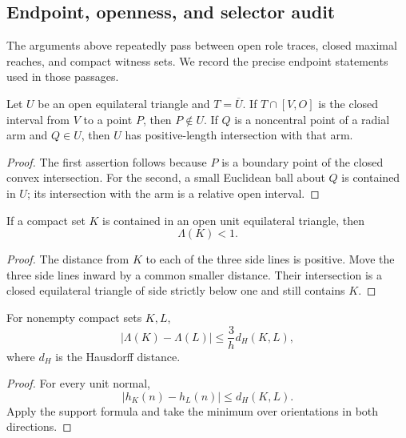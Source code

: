 \subsection{Endpoint, openness, and selector audit}
\label{subsec:new-endpoint-selector-audit}

The arguments above repeatedly pass between open role traces, closed maximal
reaches, and compact witness sets.  We record the precise endpoint statements
used in those passages.

\begin{lemma}
\label{lem:new-open-trace-endpoint}
Let $U$ be an open equilateral triangle and $T=\overline U$.  If
$T\cap[V,O]$ is the closed interval from $V$ to a point $P$, then
$P\notin U$.  If $Q$ is a noncentral point of a radial arm and $Q\in U$, then
$U$ has positive-length intersection with that arm.
\end{lemma}

\begin{proof}
The first assertion follows because $P$ is a boundary point of the closed
convex intersection.  For the second, a small Euclidean ball about $Q$ is
contained in $U$; its intersection with the arm is a relative open interval.
\end{proof}

\begin{lemma}
\label{lem:new-compact-open-shrink}
If a compact set $K$ is contained in an open unit equilateral triangle, then
\[
 \Lambda(K)<1.
\]
\end{lemma}

\begin{proof}
The distance from $K$ to each of the three side lines is positive.  Move the
three side lines inward by a common smaller distance.  Their intersection is
a closed equilateral triangle of side strictly below one and still contains
$K$.
\end{proof}

\begin{lemma}
\label{lem:new-lambda-continuity}
For nonempty compact sets $K,L$,
\[
 |\Lambda(K)-\Lambda(L)|
 \le\frac3h d_H(K,L),
\]
where $d_H$ is the Hausdorff distance.
\end{lemma}

\begin{proof}
For every unit normal,
\[
 |h_K(n)-h_L(n)|\le d_H(K,L).
\]
Apply the support formula and take the minimum over orientations in both
directions.
\end{proof}

